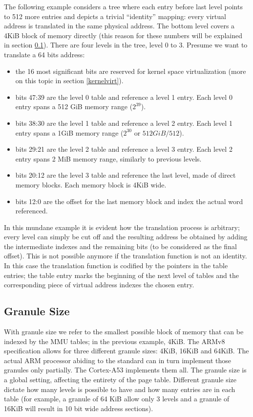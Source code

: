 \documentclass[12pt,a4paper,openright,twoside]{report}
\begin{document}
The following example considers a tree where each entry before last level
points to 512 more entries and 
depicts a trivial ``identity'' mapping: every virtual address is translated in 
the same physical address. The bottom level covers a 4KiB block of memory directly
(this reason for these numbers will be explained in section \ref{translationsize}). There
are four levels in the tree, level 0 to 3.
Presume we want to translate a 64 bits address:
\begin{itemize}
    \item the 16 most significant bits are reserved for kernel space virtualization
        (more on this topic in section \ref{kernelvirt}).
    \item bits 47:39 are the level 0 table and reference a level 1 entry. Each
        level 0 entry spans a 512 GiB memory range ($2^39$).
    \item bits 38:30 are the level 1 table and reference a level 2 entry. Each
        level 1 entry spans a 1GiB memory range ($2^30$ or $512 GiB / 512$).
    \item bits 29:21 are the level 2 table and reference a level 3 entry. Each
        level 2 entry spans 2 MiB memory range, similarly to previous levels.
    \item bits 20:12 are the level 3 table and reference the last level, made of 
        direct memory blocks. Each memory block is 4KiB wide.
    \item bits 12:0 are the offset for the last memory block and index the actual
        word referenced.
\end{itemize}


In this mundane example it is evident how the translation process is arbitrary;
every level can simply be cut off and the resulting address be obtained by adding
the intermediate indexes and the remaining bits (to be considered as the final 
offset). This is not possible anymore if the translation function is not an 
identity. 
In this case the translation function is codified by the pointers in the table entries;
the table entry marks the beginning of the next level of tables and the corresponding
piece of virtual address indexes the chosen entry.

\subsection{Granule Size}
\label{translationsize}
With granule size we refer to the smallest possible block of memory that can be 
indexed by the MMU tables; in the previous example, 4KiB.
The ARMv8 specification allows for three different granule sizes: 4KiB, 16KiB and 64KiB.
The actual ARM processor abiding to the standard can in turn implement those granules
only partially. The Cortex-A53 implements them all.
The granule size is a global setting, affecting the entirety of the page table.
Different granule size dictate how many levels is possible to have and how many
entries are in each table (for example, a granule of 64 KiB allow only 3 levels
and a granule of 16KiB will result in 10 bit wide address sections).
\end{document}
